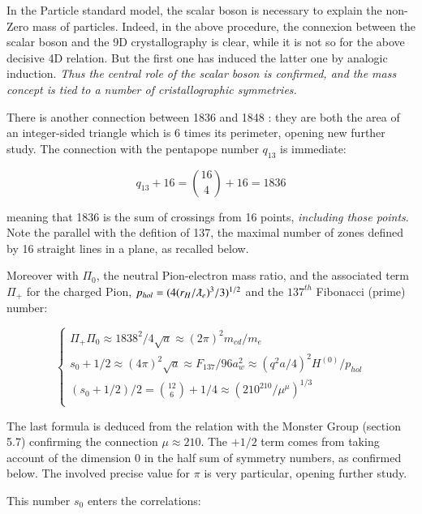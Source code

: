\documentclass[a4paper,9pt]{article}
\begin{document}
In the Particle standard  model, the scalar boson is necessary to explain the non-Zero mass of particles. Indeed, in the above procedure, the connexion between the scalar boson and the 9D crystallography is clear, while it is not so for the above decisive 4D relation. But the first one has induced the latter one by analogic induction. \textit{Thus the central role of the scalar boson is confirmed, and the mass concept is tied to a number of cristallographic symmetries.} 

There is another connection between 1836 and 1848 : they are both the area of an integer-sided triangle which is 6 times its perimeter, opening new further study. The connection with the pentapope number $q_{13}$ is immediate:

\begin{equation}\label{Eq29}
 q_{13}+16 = \binom{16}{4} + 16 = 1836
 \end{equation}
 
meaning that 1836 is the sum of crossings from 16 points, \textit {including those points}. Note the parallel with the defition of 137, the maximal number of zones defined by 16 straight lines in a plane, as recalled below.

Moreover with $\Pi_0$, the neutral Pion-electron mass ratio, and the associated term $\Pi_+$ for the charged Pion, $ p_{hol} = (4 (r_H/\lambdabar_e)^3/3)^{1/2}$ and the $137^{th}$ Fibonacci (prime) number:

 \begin{equation}\label{Eq30}
 \left\{
    \begin{array}{ll}
         \Pi_+ \Pi_0 \approx  1838^2/4\sqrt a \approx (2\pi)^2 m_{cd}/m_e \\
        s_0 + 1/2 \approx (4\pi)^2 \sqrt a \approx F_{137}/96 a_w^2 \approx (q^2a/4)^2 H^{(0)}/p_{hol} \\
          (s_0 +1/2)/2 = \binom{12}{6} + 1/4 \approx(210^{210}/\mu^{\mu})^{1/3} \\
    \end{array}
\right.
\end{equation}

The last formula is deduced from the relation with the Monster Group (section 5.7) confirming the connection $\mu \approx 210$. The $+1/2$ term comes from taking account of the dimension $0$ in the half sum of symmetry numbers, as confirmed below. The involved precise value for $\pi$ is very particular, opening further study.

This number $s_0$ enters the correlations:
\end{document}
